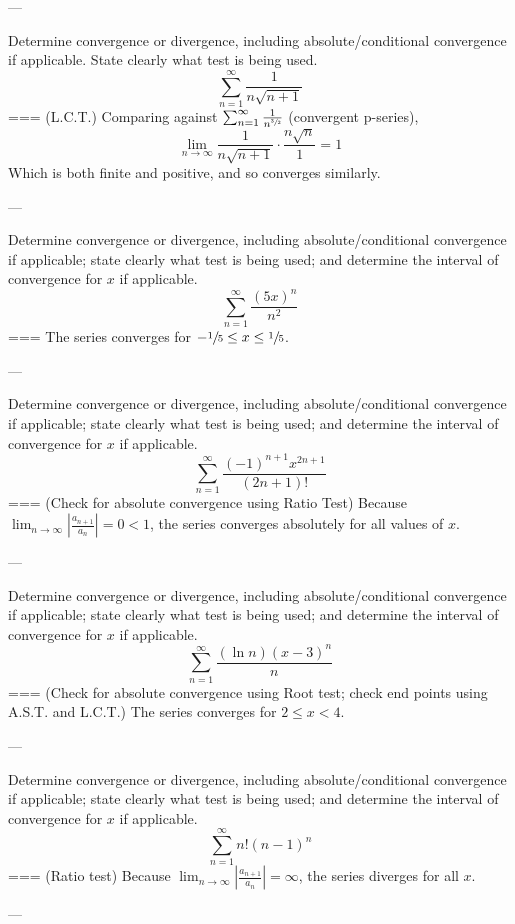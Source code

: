 ---

Determine convergence or divergence, including absolute/conditional convergence
if applicable. State clearly what test is being used.
\[\sum_{n=1}^\infty \frac{1}{n\sqrt{n+1}}\]
===
(L.C.T.) Comparing against \(\sum_{n=1}^\infty \frac{1}{n^{\sfrac{3}{2}}}\)
(convergent p-series),
\[\lim_{n\to\infty}\frac{1}{n\sqrt{n+1}}\cdot\frac{n\sqrt{n}}{1}=1\]
Which is both finite and positive, and so converges similarly.

---

Determine convergence or divergence, including absolute/conditional convergence
if applicable; state clearly what test is being used; and determine the interval
of convergence for \(x\) if applicable.
\[\sum_{n=1}^\infty\frac{{(5x)}^n}{n^2}\]
===
The series converges for \(-\sfrac{1}{5}\leq x\leq\sfrac{1}{5}\).

---

Determine convergence or divergence, including absolute/conditional convergence
if applicable; state clearly what test is being used; and determine the interval
of convergence for \(x\) if applicable.
\[\sum_{n=1}^\infty\frac{{(-1)}^{n+1}x^{2n+1}}{(2n+1)!}\]
===
(Check for absolute convergence using Ratio Test)
Because \(\lim_{n\to\infty}\left|\frac{a_{n+1}}{a_n}\right|=0<1\), the series
converges absolutely for all values of \(x\).

---

Determine convergence or divergence, including absolute/conditional convergence
if applicable; state clearly what test is being used; and determine the interval
of convergence for \(x\) if applicable.
\[\sum_{n=1}^\infty\frac{(\ln n){(x-3)}^n}{n}\]
===
(Check for absolute convergence using Root test; check end points using A.S.T.
and L.C.T.) The series converges for \(2\leq x<4\).

---

Determine convergence or divergence, including absolute/conditional convergence
if applicable; state clearly what test is being used; and determine the interval
of convergence for \(x\) if applicable.
\[\sum_{n=1}^\infty n!{(n-1)}^n\]
===
(Ratio test) Because
\(\lim_{n\to\infty}\left|\frac{a_{n+1}}{a_n}\right|=\infty\), the series
diverges for all \(x\).

---

